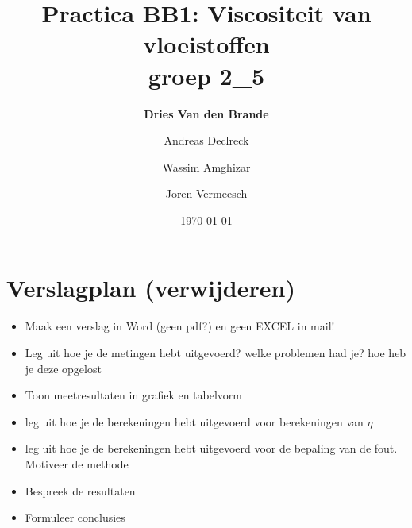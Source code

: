 \documentclass[12pt]{article}
\begin{document}
    
\title{\textbf{Practica BB1:} Viscositeit van vloeistoffen\\\small{groep 2\_5}}
\author{\textbf{Dries Van den Brande} \and Andreas Declreck \and Wassim Amghizar \and Joren Vermeesch}
\date{\today}

\maketitle

\section*{Verslagplan (verwijderen)}
\begin{itemize}
    \item Maak een verslag in Word (geen pdf?) en geen EXCEL in mail!
    \item Leg uit hoe je de metingen hebt uitgevoerd? welke problemen had je? hoe heb je deze opgelost
    \item Toon meetresultaten in grafiek en tabelvorm
    \item leg uit hoe je de berekeningen hebt uitgevoerd voor berekeningen van $\eta$
    \item leg uit hoe je de berekeningen hebt uitgevoerd voor de bepaling van de fout. Motiveer de methode
    \item Bespreek de resultaten
    \item Formuleer conclusies
\end{itemize}



%


















\end{document}

